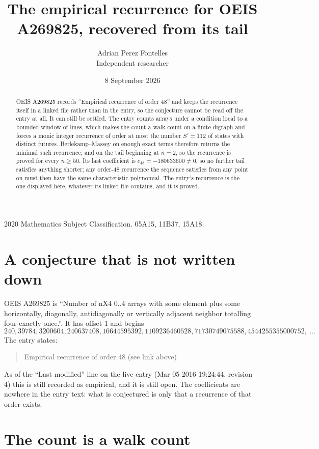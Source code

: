 \documentclass[11pt,a4paper]{article}
\title{The empirical recurrence for OEIS A269825, recovered from its tail}
\author{Adrian Perez Fontelles\\ \small Independent researcher}
\date{8 September 2026}
\theoremstyle{plain}
\theoremstyle{definition}
\begin{document}
\maketitle

\begin{abstract}
OEIS A269825 records ``Empirical recurrence of order $48$'' and keeps the recurrence itself in
a linked file rather than in the entry, so the conjecture cannot be read off the entry at all.
It can still be settled. The entry counts arrays under a condition local to a bounded window of
lines, which makes the count a walk count on a finite digraph and forces a monic integer
recurrence of order at most the number $S'=112$ of states with distinct futures. Berlekamp--Massey on
enough exact terms therefore returns the minimal such recurrence, and on the tail beginning at $n=2$, so the recurrence is proved for every $n\ge50$.
Its last coefficient is $c_{48}=-180633600\neq0$, so no further tail satisfies anything
shorter; any order-$48$ recurrence the sequence satisfies from any point on must then have
the same characteristic polynomial. The entry's recurrence is the one displayed here, whatever
its linked file contains, and it is proved.
\end{abstract}

\noindent\small 2020 Mathematics Subject Classification. 05A15, 11B37, 15A18.\normalsize

\section{A conjecture that is not written down}

OEIS A269825 is ``Number of nX4 0..4 arrays with some element plus some horizontally, diagonally, antidiagonally or vertically adjacent neighbor totalling four exactly once.''. It has offset $1$ and begins
\[
240, 39784, 3200604, 240637408, 16644595392, 1109236460528, 71730749075588, 4544255355000752,\ \dots
\]
The entry states:
\begin{quote}
Empirical recurrence of order 48 (see link above)
\end{quote}
As of the ``Last modified'' line on the live entry (Mar 05 2016 19:24:44, revision 4)
this is still recorded as empirical, and it is still open. The coefficients are nowhere in the
entry text: what is conjectured is only that a recurrence of that order exists.

\section{The count is a walk count}
\end{document}

